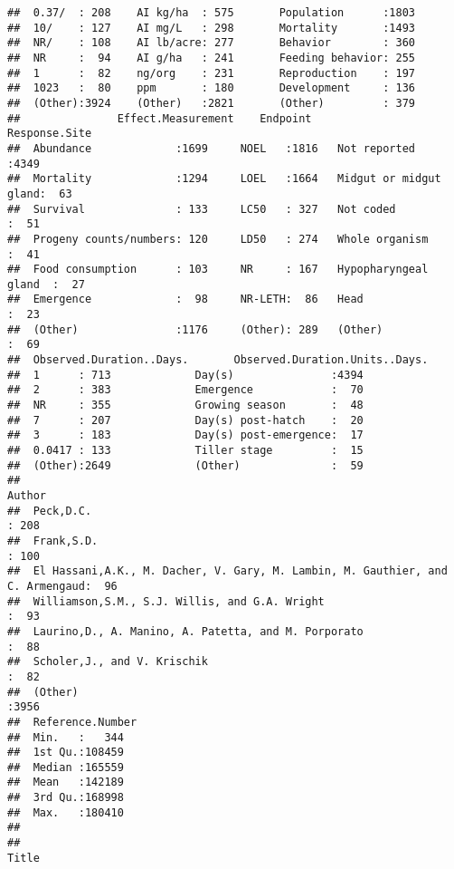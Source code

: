\documentclass[]{article}
\begin{document}
\begin{verbatim}
##  0.37/  : 208    AI kg/ha  : 575       Population      :1803  
##  10/    : 127    AI mg/L   : 298       Mortality       :1493  
##  NR/    : 108    AI lb/acre: 277       Behavior        : 360  
##  NR     :  94    AI g/ha   : 241       Feeding behavior: 255  
##  1      :  82    ng/org    : 231       Reproduction    : 197  
##  1023   :  80    ppm       : 180       Development     : 136  
##  (Other):3924    (Other)   :2821       (Other)         : 379  
##               Effect.Measurement    Endpoint                   Response.Site 
##  Abundance             :1699     NOEL   :1816   Not reported          :4349  
##  Mortality             :1294     LOEL   :1664   Midgut or midgut gland:  63  
##  Survival              : 133     LC50   : 327   Not coded             :  51  
##  Progeny counts/numbers: 120     LD50   : 274   Whole organism        :  41  
##  Food consumption      : 103     NR     : 167   Hypopharyngeal gland  :  27  
##  Emergence             :  98     NR-LETH:  86   Head                  :  23  
##  (Other)               :1176     (Other): 289   (Other)               :  69  
##  Observed.Duration..Days.       Observed.Duration.Units..Days.
##  1      : 713             Day(s)               :4394          
##  2      : 383             Emergence            :  70          
##  NR     : 355             Growing season       :  48          
##  7      : 207             Day(s) post-hatch    :  20          
##  3      : 183             Day(s) post-emergence:  17          
##  0.0417 : 133             Tiller stage         :  15          
##  (Other):2649             (Other)              :  59          
##                                                                            Author    
##  Peck,D.C.                                                                    : 208  
##  Frank,S.D.                                                                   : 100  
##  El Hassani,A.K., M. Dacher, V. Gary, M. Lambin, M. Gauthier, and C. Armengaud:  96  
##  Williamson,S.M., S.J. Willis, and G.A. Wright                                :  93  
##  Laurino,D., A. Manino, A. Patetta, and M. Porporato                          :  88  
##  Scholer,J., and V. Krischik                                                  :  82  
##  (Other)                                                                      :3956  
##  Reference.Number
##  Min.   :   344  
##  1st Qu.:108459  
##  Median :165559  
##  Mean   :142189  
##  3rd Qu.:168998  
##  Max.   :180410  
##                  
##                                                                                                                                         Title     

\end{verbatim}
\end{document}
